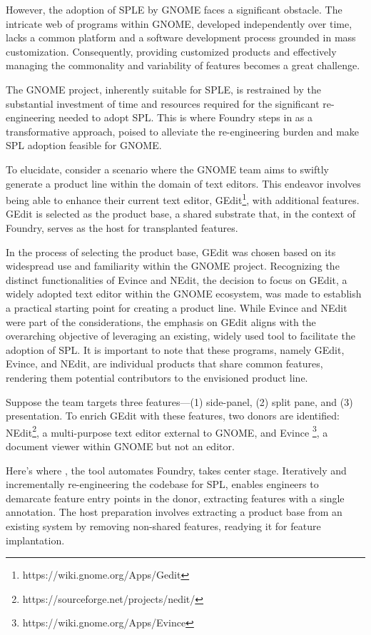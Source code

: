 However, the adoption of SPLE by GNOME faces a significant obstacle. The intricate web of programs within GNOME, developed independently over time, lacks a common platform and a software development process grounded in mass customization. Consequently, providing customized products and effectively managing the commonality and variability of features becomes a great challenge.

The GNOME project, inherently suitable for SPLE, is restrained by the substantial investment of time and resources required for the significant re-engineering needed to adopt SPL. This is where Foundry steps in as a transformative approach, poised to alleviate the re-engineering burden and make SPL adoption feasible for GNOME.

To elucidate, consider a scenario where the GNOME team aims to swiftly generate a product line within the domain of text editors. This endeavor involves being able to enhance their current text editor, GEdit\footnote{https://wiki.gnome.org/Apps/Gedit}, with additional features. GEdit is selected as the product base, a shared substrate that, in the context of Foundry, serves as the host for transplanted features.

In the process of selecting the product base, GEdit was chosen based on its widespread use and familiarity within the GNOME project. Recognizing the distinct functionalities of Evince and NEdit, the decision to focus on GEdit, a widely adopted text editor within the GNOME ecosystem, was made to establish a practical starting point for creating a product line. While Evince and NEdit were part of the considerations, the emphasis on GEdit aligns with the overarching objective of leveraging an existing, widely used tool to facilitate the adoption of SPL. It is important to note that these programs, namely GEdit, Evince, and NEdit, are individual products that share common features, rendering them potential contributors to the envisioned product line.

Suppose the team targets three features—(1) side-panel, (2) split pane, and (3) presentation. To enrich GEdit with these features, two donors are identified: NEdit\footnote{https://sourceforge.net/projects/nedit/}, a multi-purpose text editor external to GNOME, and Evince \footnote{https://wiki.gnome.org/Apps/Evince}, a document viewer within GNOME but not an editor.

Here's where \prodScalpel, the tool automates Foundry, takes center stage. Iteratively and incrementally re-engineering the codebase for SPL, \prodScalpel enables engineers to demarcate feature entry points in the donor, extracting features with a single annotation. The host preparation involves extracting a product base from an existing system by removing non-shared features, readying it for feature implantation.

